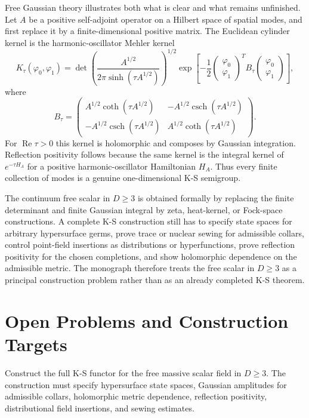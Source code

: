 Free Gaussian theory illustrates both what is clear and what remains
unfinished.  Let \(A\) be a positive self-adjoint operator on a Hilbert space
of spatial modes, and first replace it by a finite-dimensional positive
matrix.  The Euclidean cylinder kernel is the harmonic-oscillator Mehler
kernel
\[
  K_\tau(\varphi_0,\varphi_1)
  =
  \det\!\left(\frac{A^{1/2}}{2\pi\sinh(\tau A^{1/2})}\right)^{1/2}
  \exp\!\left[
    -\frac12
    \begin{pmatrix}\varphi_0\\ \varphi_1\end{pmatrix}^{T}
    B_\tau
    \begin{pmatrix}\varphi_0\\ \varphi_1\end{pmatrix}
  \right],
\]
where
\[
  B_\tau=
  \begin{pmatrix}
    A^{1/2}\coth(\tau A^{1/2})&
    -A^{1/2}\operatorname{csch}(\tau A^{1/2})\\
    -A^{1/2}\operatorname{csch}(\tau A^{1/2})&
    A^{1/2}\coth(\tau A^{1/2})
  \end{pmatrix}.
\]
For \(\operatorname{Re}\tau>0\) this kernel is holomorphic and composes by
Gaussian integration.  Reflection positivity follows because the same kernel
is the integral kernel of \(e^{-\tau H_A}\) for a positive harmonic-oscillator
Hamiltonian \(H_A\).  Thus every finite collection of modes is a genuine
one-dimensional K-S semigroup.

The continuum free scalar in \(D\ge3\) is obtained formally by replacing
the finite determinant and finite Gaussian integral by zeta, heat-kernel, or
Fock-space constructions.  A complete K-S construction still has to specify
state spaces for arbitrary hypersurface germs, prove trace or nuclear sewing
for admissible collars, control point-field insertions as distributions or
hyperfunctions, prove reflection positivity for the chosen completions, and
show holomorphic dependence on the admissible metric.  The monograph
therefore treats the free scalar in \(D\ge3\) as a principal construction
problem rather than as an already completed K-S theorem.

\section{Open Problems and Construction Targets}

\begin{openproblem}
Construct the full K-S functor for the free massive scalar field in
\(D\ge3\).  The construction must specify hypersurface state spaces,
Gaussian amplitudes for admissible collars, holomorphic metric dependence,
reflection positivity, distributional field insertions, and sewing estimates.
\end{openproblem}

